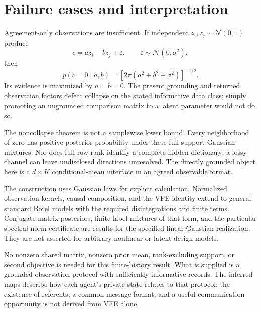 \documentclass[11pt]{article}
\theoremstyle{definition}
\theoremstyle{remark}
\newcommand{\N}{\mathcal N}
\begin{document}
\section{Failure cases and interpretation}

Agreement-only observations are insufficient. If independent \(z_i,z_j\sim\N(0,1)\) produce
\[
c=az_i-bz_j+\varepsilon,\qquad
\varepsilon\sim\N(0,\sigma^2),
\]
then
\[
p(c=0\mid a,b)
=
\left[2\pi(a^2+b^2+\sigma^2)\right]^{-1/2}.
\]
Its evidence is maximized by \(a=b=0\). The present grounding and returned observation factors defeat collapse on the stated informative data class; simply promoting an ungrounded comparison matrix to a latent parameter would not do so.

The noncollapse theorem is not a samplewise lower bound. Every neighborhood of zero has positive posterior probability under these full-support Gaussian mixtures. Nor does full row rank identify a complete hidden dictionary: a lossy channel can leave undisclosed directions unresolved. The directly grounded object here is a \(d\times K\) conditional-mean interface in an agreed observable format.

The construction uses Gaussian laws for explicit calculation. Normalized observation kernels, causal composition, and the VFE identity extend to general standard Borel models with the required disintegrations and finite terms. Conjugate matrix posteriors, finite label mixtures of that form, and the particular spectral-norm certificate are results for the specified linear-Gaussian realization. They are not asserted for arbitrary nonlinear or latent-design models.

No nonzero shared matrix, nonzero prior mean, rank-excluding support, or second objective is needed for this finite-history result. What is supplied is a grounded observation protocol with sufficiently informative records. The inferred maps describe how each agent's private state relates to that protocol; the existence of referents, a common message format, and a useful communication opportunity is not derived from VFE alone.
\end{document}
